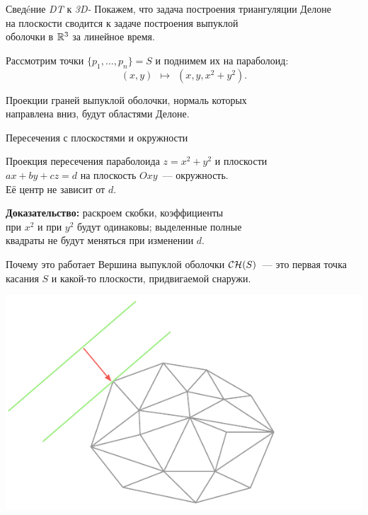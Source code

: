 \begin{frame}{Сведéние {\it DT} к {\it 3D-\CH}}
	Покажем, что задача построения триангуляции Делоне \\
	на плоскости сводится к задаче построения выпуклой \\
	оболочки в \(\mathbb{R}^3\) за линейное время.

	Рассмотрим точки \(\{p_1, \ldots, p_n\} = S\) и поднимем их на параболоид:
	\[(x,y)\ \ \mapsto\ \ (x,y,x^2+y^2).\] \smallskip

\begin{thm}
	Проекции граней выпуклой оболочки, нормаль которых \\
	направлена вниз, будут областями Делоне.
\end{thm}
\end{frame}


\begin{frame}{Пересечения с плоскостями и окружности}
\begin{lm}
	Проекция пересечения параболоида \(z = x^2 + y^2\) и плоскости \\
	\(ax+by+cz=d\) на плоскость \(Oxy\)~— окружность. \\
	Её центр не зависит от \(d\).
\end{lm} \medskip

	{\bf Доказательство:} раскроем скобки, коэффициенты \\
	при \(x^2\) и при \(y^2\) будут одинаковы; выделенные полные \\
	квадраты не будут меняться при изменении \(d\).
\end{frame}


\begin{frame}{Почему это работает}
	Вершина выпуклой оболочки \(\mathcal{C}\mathcal{H}(S)\)~— это первая точка \\
	касания \(S\) и какой-то плоскости, придвигаемой снаружи.
\begin{center} \includegraphics[scale=0.85]{svg/firstTangent} \end{center}
\end{frame}


